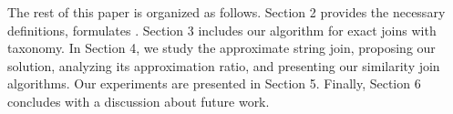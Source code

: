 \smallskip

The rest of this paper is organized as follows. Section 2
provides the necessary definitions, formulates . Section
3 includes our algorithm for exact joins with taxonomy. In Section 4, we study
the approximate string join, proposing our solution, analyzing its approximation
ratio, and presenting our similarity join algorithms.
Our experiments are presented in Section 5. Finally,
Section 6 concludes with a discussion about future work.
